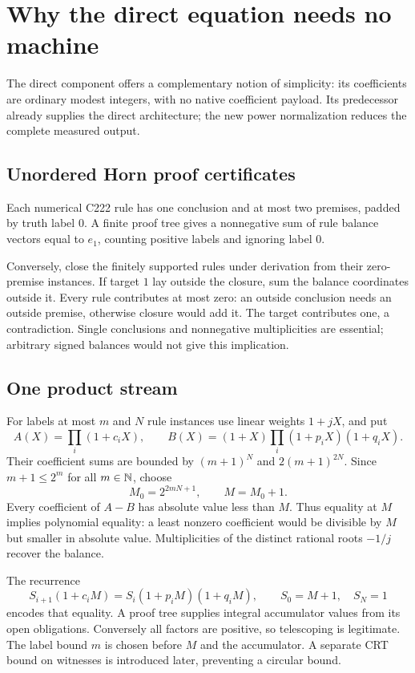 \documentclass[11pt,letterpaper]{article}
\theoremstyle{remark}\newtheorem{remark}[theorem]{Remark}
\begin{document}


\section{Why the direct equation needs no machine}
\label{sec:directflow}
The direct component offers a complementary notion of simplicity: its
coefficients are ordinary modest integers, with no native coefficient
payload. Its predecessor already supplies the direct architecture; the new
power normalization reduces the complete measured output.

\subsection{Unordered Horn proof certificates}
Each numerical C222 rule has one conclusion and at most two premises,
padded by truth label $0$. A finite proof tree gives a nonnegative sum of
rule balance vectors equal to $e_1$, counting positive labels and ignoring
label $0$.

Conversely, close the finitely supported rules under derivation from their
zero-premise instances. If target $1$ lay outside the closure, sum the
balance coordinates outside it. Every rule contributes at most zero:
an outside conclusion needs an outside premise, otherwise closure would
add it. The target contributes one, a contradiction.
Single conclusions and nonnegative multiplicities are essential;
arbitrary signed balances would not give this implication.

\subsection{One product stream}
For labels at most $m$ and $N$ rule instances use linear weights
$1+jX$, and put
\[
 A(X)=\prod_i(1+c_iX),\qquad
 B(X)=(1+X)\prod_i(1+p_iX)(1+q_iX).
\]
Their coefficient sums are bounded by $(m+1)^N$ and
$2(m+1)^{2N}$. Since $m+1\le2^m$ for all $m\in\mathbb N$, choose
\[
 M_0=2^{2mN+1},\qquad M=M_0+1.
\]
Every coefficient of $A-B$ has absolute value less than $M$.
Thus equality at $M$ implies polynomial equality: a least nonzero
coefficient would be divisible by $M$ but smaller in absolute value.
Multiplicities of the distinct rational roots $-1/j$ recover the balance.

The recurrence
\[
 S_{i+1}(1+c_iM)=S_i(1+p_iM)(1+q_iM),\qquad
 S_0=M+1,\quad S_N=1
\]
encodes that equality. A proof tree supplies integral accumulator values
from its open obligations. Conversely all factors are positive, so
telescoping is legitimate. The label bound $m$ is chosen before $M$ and
the accumulator. A separate CRT bound on witnesses is introduced later,
preventing a circular bound.
\end{document}
